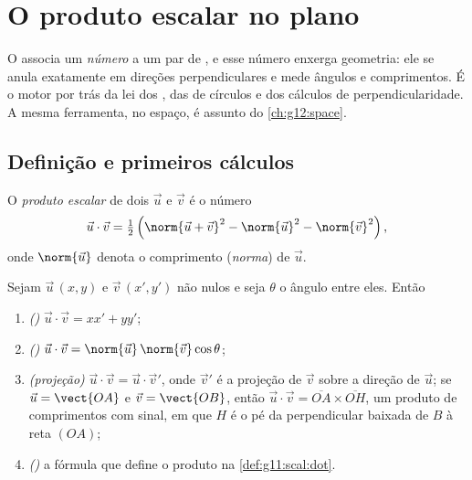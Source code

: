 \chapter{O produto escalar no plano}\label{ch:g11:scal}

O  associa um \emph{número} a um par de , e esse
número enxerga geometria: ele se anula exatamente em direções
perpendiculares e mede ângulos e comprimentos. É o motor por trás da lei
dos , das  de círculos e dos cálculos de
perpendicularidade. A mesma ferramenta, no espaço, é assunto do
\cref{ch:g12:space}.

\section{Definição e primeiros cálculos}

\begin{definition}\label{def:g11:scal:dot}
O \emph{produto escalar} de dois  $\vec u$
e $\vec v$ é o número
\[
\vec u \cdot \vec v
= \tfrac12\left(\norm{\vec u + \vec v}^2 - \norm{\vec u}^2
- \norm{\vec v}^2\right),
\]
onde $\norm{\vec u}$ denota o comprimento (\emph{norma}) de
$\vec u$.
\end{definition}

\begin{theorem}\label{thm:g11:scal:faces}
Sejam $\vec u\,(x, y)$ e $\vec v\,(x', y')$  não nulos e seja
$\theta$ o ângulo entre eles. Então
\begin{enumerate}
  \item \emph{()} $\vec u \cdot \vec v = xx' + yy'$;
  \item \emph{()} $\vec u \cdot \vec v =
        \norm{\vec u}\,\norm{\vec v}\cos\theta$;
  \item \emph{(projeção)} $\vec u \cdot \vec v = \vec u \cdot \vec v'$,
        onde $\vec v'$ é a projeção  de $\vec v$ sobre a direção
        de $\vec u$; se $\vec u = \vect{OA}$ e $\vec v = \vect{OB}$,
        então $\vec u \cdot \vec v = \overline{OA} \times \overline{OH}$,
        um produto de comprimentos com sinal, em que $H$ é o pé da
        perpendicular baixada de $B$ à reta $(OA)$;
  \item \emph{()} a fórmula que define o produto na
        \cref{def:g11:scal:dot}.
\end{enumerate}
\end{theorem}


